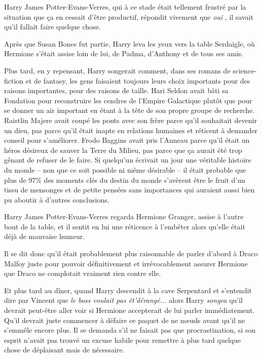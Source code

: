 Harry James Potter-Evans-Verres, qui à ce stade était tellement frustré par la situation que ça en cessait d'être productif, répondit vivement que \emph{oui} , il savait qu'il fallait faire quelque chose.

Après que Susan Bones fut partie, Harry leva les yeux vers la table Serdaigle, où Hermione s'était assise loin de lui, de Padma, d'Anthony et de tous ses amis.

Plus tard, en y repensant, Harry songerait comment, dans ses romans de science-fiction et de fantasy, les gens faisaient toujours leurs choix importants pour des raisons importantes, pour des raisons de taille. Hari Seldon avait bâti sa Fondation pour reconstruire les cendres de l'Empire Galactique plutôt que pour se donner un air important en étant à la tête de son propre groupe de recherche. Raistlin Majere avait coupé les ponts avec son frère parce qu'il souhaitait devenir un dieu, pas parce qu'il était inapte en relations humaines et réticent à demander conseil pour s'améliorer. Frodo Baggins avait pris l'Anneau parce qu'il était un héros désireux de sauver la Terre du Milieu, pas parce que ça aurait été trop gênant de refuser de le faire. Si quelqu'un écrivait un jour une véritable histoire du monde – non que ce soit possible ni même désirable – il était probable que plus de 97\% des moments clés du destin du monde s'avèrent être le fruit d'un tissu de mensonges et de petite pensées sans importances qui auraient aussi bien pu aboutir à d'autres conclusions.

Harry James Potter-Evans-Verres regarda Hermione Granger, assise à l'autre bout de la table, et il sentit en lui une réticence à l'embêter alors qu'elle était déjà de mauvaise humeur.

Il se dit donc qu'il était probablement plus raisonnable de parler d'abord à Draco Malfoy juste pour pouvoir définitivement et irrévocablement assurer Hermione que Draco ne complotait vraiment rien contre elle.

Et plus tard au dîner, quand Harry descendit à la cave Serpentard et s'entendit dire par Vincent que \emph{le boss voulait pas êt'dérangé...}  alors Harry \emph{songea}  qu'il devrait peut-être aller voir si Hermione accepterait de lui parler immédiatement. Qu'il devrait juste commencer à défaire ce paquet de ne nœuds avant qu'il ne s'emmêle encore plus. Il se demanda s'il ne faisait pas que procrastination, si son esprit n'avait pas trouvé un excuse habile pour remettre à plus tard quelque chose de déplaisant mais de nécessaire.

